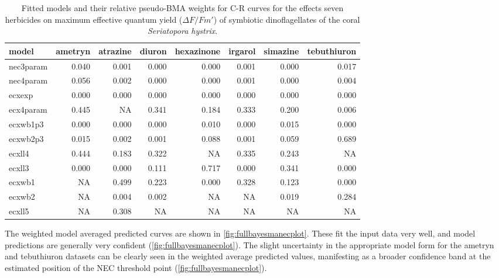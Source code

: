 \documentclass[
  shortnames]{jss}
\begin{document}
\begin{CodeChunk}
\begin{table}

\centering
\begin{tabular}[t]{l|r|r|r|r|r|r|r}
\hline
model & ametryn & atrazine & diuron & hexazinone & irgarol & simazine & tebuthiuron\\
\hline
nec3param & 0.040 & 0.001 & 0.000 & 0.000 & 0.001 & 0.000 & 0.017\\
\hline
nec4param & 0.056 & 0.002 & 0.000 & 0.000 & 0.001 & 0.000 & 0.004\\
\hline
ecxexp & 0.000 & 0.000 & 0.000 & 0.000 & 0.000 & 0.000 & 0.000\\
\hline
ecx4param & 0.445 & NA & 0.341 & 0.184 & 0.333 & 0.200 & 0.006\\
\hline
ecxwb1p3 & 0.000 & 0.000 & 0.000 & 0.010 & 0.000 & 0.015 & 0.000\\
\hline
ecxwb2p3 & 0.015 & 0.002 & 0.001 & 0.088 & 0.001 & 0.059 & 0.689\\
\hline
ecxll4 & 0.444 & 0.183 & 0.322 & NA & 0.335 & 0.243 & NA\\
\hline
ecxll3 & 0.000 & 0.000 & 0.111 & 0.717 & 0.000 & 0.341 & 0.000\\
\hline
ecxwb1 & NA & 0.499 & 0.223 & 0.000 & 0.328 & 0.123 & 0.000\\
\hline
ecxwb2 & NA & 0.004 & 0.002 & NA & NA & 0.019 & 0.284\\
\hline
ecxll5 & NA & 0.308 & NA & NA & NA & NA & NA\\
\hline
\end{tabular}
\caption{\label{tab:weightsTab}Fitted models and their relative pseudo-BMA weights for C-R curves for the effects seven herbicides on maximum effective quantum yield ($\Delta F / Fm'$) of symbiotic dinoflagellates of the coral \textit{Seriatopora hystrix}.}
\end{table}

\end{CodeChunk}

The weighted model averaged predicted curves are shown in \autoref{fig:fullbayesmanecplot}. These fit the input data very well, and model predictions are generally very confident (\autoref{fig:fullbayesmanecplot}). The slight uncertainty in the appropriate model form for the ametryn and tebuthiuron datasets can be clearly seen in the weighted average predicted values, manifesting as a broader confidence band at the estimated position of the NEC threshold point (\autoref{fig:fullbayesmanecplot}).
\end{document}
